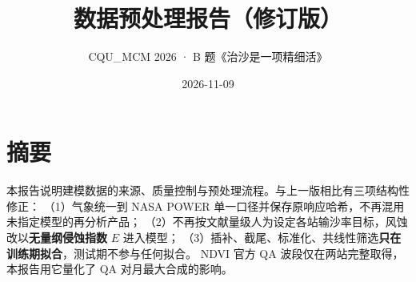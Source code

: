 \documentclass[11pt,a4paper]{ctexart}
\title{数据预处理报告（修订版）}
\author{CQU\_MCM 2026 · B 题《治沙是一项精细活》}
\date{2026-11-09}
\begin{document}
\maketitle
\thispagestyle{empty}
\newpage

\section*{摘\quad 要}
本报告说明建模数据的来源、质量控制与预处理流程。与上一版相比有三项结构性修正：
（1）气象统一到 NASA POWER 单一口径并保存原响应哈希，不再混用未指定模型的再分析产品；
（2）不再按文献量级人为设定各站输沙率目标，风蚀改以\textbf{无量纲侵蚀指数} $E$ 进入模型；
（3）插补、截尾、标准化、共线性筛选\textbf{只在训练期拟合}，测试期不参与任何拟合。
NDVI 官方 QA 波段仅在两站完整取得，本报告用它量化了 QA 对月最大合成的影响。
\end{document}
